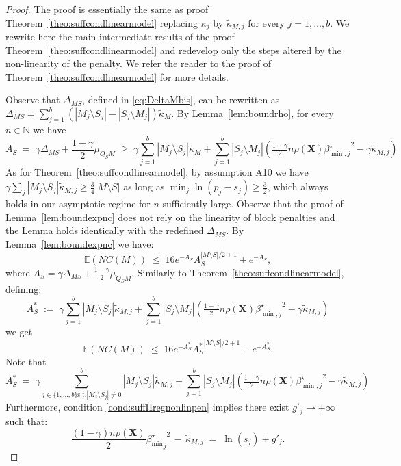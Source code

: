 \documentclass[aos]{imsart}
\theoremstyle{plain}
\newcommand{\E}{\mathbb{E}}
\newcommand{\N}{\mathbb{N}}
\newcommand{\bs}{\boldsymbol}
\begin{document}
\begin{proof}
The proof is essentially the same as proof Theorem~\ref{theo:suffcondlinearmodel} replacing $\kappa_j$ by $\tilde{\kappa}_{M, j}$ for every $j=1,\ldots,b$. We rewrite here the main intermediate results of the proof Theorem~\ref{theo:suffcondlinearmodel} and redevelop only the steps altered by the non-linearity of the penalty. We refer the reader to the proof of Theorem~\ref{theo:suffcondlinearmodel} for more details.

Observe that $\Delta_{MS}$, defined in \eqref{eq:DeltaMbis}, can be rewritten as $\Delta_{MS}=\sum_{j=1}^b(|M_j\setminus S_j|-|S_j\setminus M_j|)\tilde{\kappa}_{M}$. By  Lemma~\ref{lem:boundrho}, for every $n\in \N$ we have 
\begin{equation}\label{eq:nonoverfittingcondgen}
   A_S\;=\; \gamma \Delta_{MS}+\frac{1-\gamma}{2}\mu_{Q_SM}\;\geq\; \gamma\sum_{j=1}^b|M_j \setminus S_j|\tilde{\kappa}_{M} + \sum_{j=1}^b |S_j\setminus M_j |\left(\tfrac{1-\gamma}{2} n \rho(\bs X) {\beta^{\star}_{\min,j}}^{2} - \gamma\tilde{\kappa}_{M, j}\right) 
\end{equation} 
As for Theorem~\ref{theo:suffcondlinearmodel}, by assumption A10 we have $\gamma\sum_{j}|M_j\setminus S_j|\tilde{\kappa}_{M, j}\geq \tfrac{3}{4}|M\setminus S|$ as long as $\min_j \ln(p_j-s_j)\geq \tfrac32$, which always holds in our asymptotic regime for $n$ sufficiently large. Observe that the proof of Lemma~\ref{lem:boundexpnc} does not rely on the linearity of block penalties and the Lemma holds identically with the redefined $\Delta_{MS}$.  By Lemma~\ref{lem:boundexpnc} we have:
$$
\E(NC(M))\;\leq\;16 e^{-A_S}A_S^{|M\setminus S|/2+1}+e^{-A_S},
$$
where $A_S=\gamma\Delta_{MS}+\tfrac{1-\gamma}{2}\mu_{Q_SM}$. Similarly to Theorem~\ref{theo:suffcondlinearmodel}, defining:
$$A_S^*\;:=\;\gamma\sum_{j=1}^b|M_j \setminus S_j|\tilde{\kappa}_{M, j} + \sum_{j=1}^b |S_j\setminus M_j |\left(\tfrac{1-\gamma}{2} n \rho(\bs X) {\beta^{\star}_{\min,j}}^{2} - \gamma\tilde{\kappa}_{M, j}\right) $$
we get 
$$
\E(NC(M))\;\leq\;16 e^{-A_S^*}{A_S^*}^{|M\setminus S|/2+1}+e^{-A_S^*}.
$$
Note that 
$$A_S^*\;=\;\gamma\sum_{j \in \{1,\ldots, b\} \text{s.t.} |M_j \setminus S_j| \neq 0}^b|M_j \setminus S_j|\tilde{\kappa}_{M, j} + \sum_{j=1}^b |S_j\setminus M_j |\left(\tfrac{1-\gamma}{2} n \rho(\bs X) {\beta^{\star}_{\min,j}}^{2} - \gamma\tilde{\kappa}_{M, j}\right) $$
Furthermore, condition \eqref{cond:suffIIregnonlinpen} implies there exist $g'_j \to +\infty$ such that:
$$\frac{(1-\gamma) n\rho(\bs X)}{2}{{\beta_{\min}^{\star}}_j}^2 \,- \,\tilde{\kappa}_{M, j} \;=\; \ln(s_j) + g'_{j}.$$

\end{proof}
\end{document}
